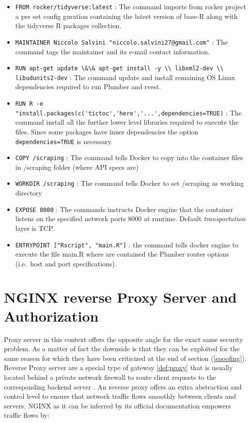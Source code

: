 \documentclass[
  12pt,
  a4paper,
  oneside]{book}
\newcommand{\passthrough}[1]{#1}
\theoremstyle{definition}
\theoremstyle{definition}
\theoremstyle{definition}
\theoremstyle{remark}
\begin{document}
\begin{itemize}
\item
  \passthrough{\lstinline!FROM rocker/tidyverse:latest!} : The command imports from rocker project a pre set config guration containing the latest version of base-R along with the tidyverse \citep{tidyverse} R packages collection.
\item
  \passthrough{\lstinline!MAINTAINER Niccolo Salvini "niccolo.salvini27@gmail.com"!} : The command tags the maintainer and its e-mail contact information.
\item
  \passthrough{\lstinline!RUN apt-get update \&\& apt-get install -y \\ libxml2-dev \\ libudunits2-dev!} : The command update and install remaining OS Linux dependencies required to run Plumber and rvest.
\item
  \passthrough{\lstinline!RUN R -e "install.packages(c('tictoc','here','...',dependencies=TRUE)!} : The command install all the further lower level libraries required to execute the files. Since some packages have inner dependencies the option \passthrough{\lstinline!dependencies=TRUE!} is necessary.
\item
  \passthrough{\lstinline!COPY /scraping!} : The command tells Docker to copy into the container files in /scraping folder (where API specs are)
\item
  \passthrough{\lstinline!WORKDIR /scraping!} : The command tells Docker to set /scraping as working directory
\item
  \passthrough{\lstinline!EXPOSE 8000!} : The commands instructs Docker engine that the container listens on the specified network ports 8000 at runtime. Default \emph{transportation} layer is TCP.
\item
  \passthrough{\lstinline!ENTRYPOINT ["Rscript", "main.R"]!} : the command tells docker engine to execute the file main.R where are contained the Plumber router options (i.e.~host and port specifications).
\end{itemize}

\hypertarget{nginx}{%
\section{NGINX reverse Proxy Server and Authorization}\label{nginx}}

Proxy server in this context offers the opposite angle for the exact same security problem. As a matter of fact the downside is that they can be exploited for the same reason for which they have been criticized at the end of section (\ref{spoofing}). Reverse Proxy server are a special type of gateway \ref{def:proxy} that is usually located behind a private network firewall to route client requests to the corresponding backend server \citep{nginxDocs}. An reverse proxy offers an extra abstraction and control level to ensure that network traffic flows smoothly between clients and servers. NGINX as it can be inferred by its official documentation empowers traffic flows by:
\end{document}
